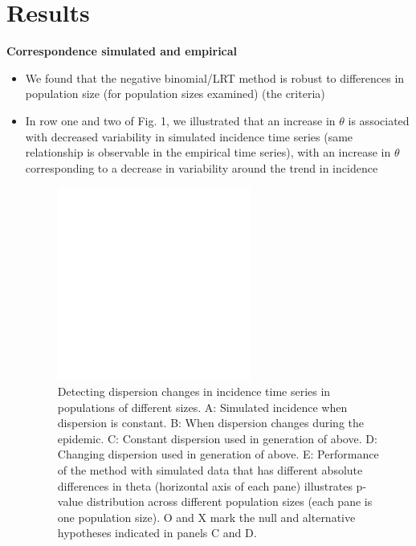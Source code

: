 \documentclass{beamer}
\begin{document}
\section{Results}
\begin{frame}{\textbf{Correspondence simulated and empirical}}
	\begin{itemize}[<+-| alert@+>]
		\item We found that the negative binomial/LRT method is robust to differences in population size (for population sizes examined) (the criteria)
		\item In row one and two of Fig. 1, we illustrated that an increase in \begin{math}\theta\end{math} is associated with decreased variability in simulated incidence time series  (same relationship is observable in the empirical time series), with an increase in \begin{math}\theta\end{math} corresponding to a decrease in variability around the trend in incidence
		\begin{figure}[!h]
			\includegraphics[width=0.6\textwidth]{fig1}
			\caption{
				Detecting dispersion changes in incidence time series in populations of different sizes. A: Simulated incidence when dispersion is constant. B: When dispersion changes during the epidemic. C: Constant dispersion used in generation of above. D: Changing dispersion used in generation of above. E:  Performance of the method with simulated data that has different absolute differences in theta (horizontal axis of each pane) illustrates p-value distribution across different population sizes (each pane is one population size). O and X mark the null and alternative hypotheses indicated in panels C and D. 
			}
			\label{fig1}
		\end{figure}
	\end{itemize}
\end{frame}
\end{document}
